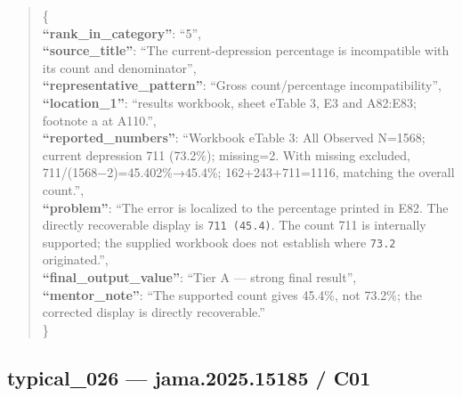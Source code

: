\documentclass[
  letterpaper,
  9pt]{extreport}
\begin{document}
\begin{quote}
\{\\
\textbf{``rank\_in\_category''}: ``5'',\\
\textbf{``source\_title''}: ``The current-depression percentage is
incompatible with its count and denominator'',\\
\textbf{``representative\_pattern''}: ``Gross count/percentage
incompatibility'',\\
\textbf{``location\_1''}: ``results workbook, sheet eTable 3, E3 and
A82:E83; footnote a at A110.'',\\
\textbf{``reported\_numbers''}: ``Workbook eTable 3: All Observed
N=1568; current depression 711 (73.2\%); missing=2. With missing
excluded, 711/(1568−2)=45.402\%→45.4\%; 162+243+711=1116, matching the
overall count.'',\\
\textbf{``problem''}: ``The error is localized to the percentage printed
in E82. The directly recoverable display is \texttt{711\ (45.4)}. The
count 711 is internally supported; the supplied workbook does not
establish where \texttt{73.2} originated.'',\\
\textbf{``final\_output\_value''}: ``Tier A --- strong final result'',\\
\textbf{``mentor\_note''}: ``The supported count gives 45.4\%, not
73.2\%; the corrected display is directly recoverable.''\\
\}
\end{quote}

\hypertarget{typical_026--jama202515185--c01}{%
\subsection{typical\_026 --- jama.2025.15185 /
C01}\label{typical_026--jama202515185--c01}}
\end{document}
